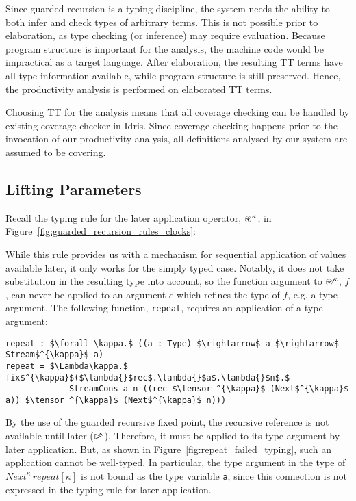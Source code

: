 Since guarded recursion is a typing discipline, the system needs the ability to
both infer and check types of arbitrary terms. This is not possible prior to
elaboration, as type checking (or inference) may require evaluation. Because program
structure is important for the analysis, the machine code would be impractical
as a target language. After elaboration, the resulting TT
terms have all type information available, while program structure is still
preserved. Hence, the productivity analysis is performed on elaborated TT terms.

Choosing TT for the analysis means that all coverage checking can be handled by existing coverage checker
in Idris. Since coverage checking happens prior to the invocation of our
productivity analysis, all definitions analysed by our system are assumed to be covering.

\subsection{Lifting Parameters} %
\label{sec:handling-parameters}
Recall the typing rule for the later application operator, $\circledast^\kappa$, in
Figure~\ref{fig:guarded_recursion_rules_clocks}:



While this rule provides us with a mechanism for sequential application of
values available later, it only works for the simply typed case. Notably, it
does not take substitution in the resulting type into account, so the function
argument to $\circledast^\kappa$, $f$, can never be applied to an argument $e$ which
refines the type of $f$, e.g. a type argument. The following function,
\texttt{repeat}, requires an application of a type argument:

\begin{lstlisting}[mathescape,title=\ttBlock]
repeat : $\forall \kappa.$ ((a : Type) $\rightarrow$ a $\rightarrow$ Stream$^{\kappa}$ a)
repeat = $\Lambda\kappa.$ fix$^{\kappa}$($\lambda{}$rec$.\lambda{}$a$.\lambda{}$n$.$ 
             StreamCons a n ((rec $\tensor ^{\kappa}$ (Next$^{\kappa}$ a)) $\tensor ^{\kappa}$ (Next$^{\kappa}$ n)))
\end{lstlisting}

By the use of the guarded recursive fixed point, the recursive reference is not
available until later ($\rhd^{\!\!\kappa}$). Therefore, it must be
applied to its type argument by later application. But, as shown in
Figure~\ref{fig:repeat_failed_typing}, such an application cannot be well-typed. In
particular, the type argument in the type of ${Next^{\kappa}\,repeat[\kappa]}$ is not bound as the type variable \texttt{a},
since this connection is not expressed in the typing rule for later application.

